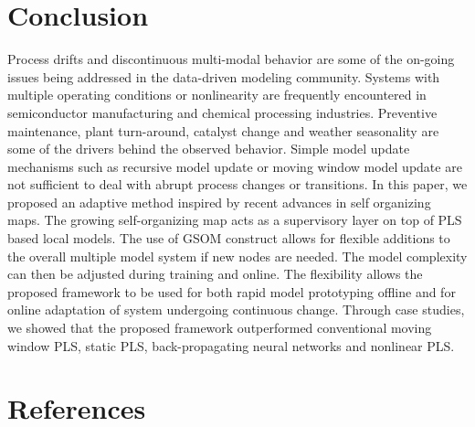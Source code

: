 \documentclass[review,3p]{elsarticle}
\renewcommand\[{\begin{equation}}
\renewcommand\]{\end{equation}}
\begin{document}
\section{Conclusion}
Process drifts and discontinuous multi-modal behavior are some of the on-going issues being addressed in the data-driven modeling community. Systems with multiple operating conditions or nonlinearity are frequently encountered in semiconductor manufacturing and chemical processing industries. Preventive maintenance, plant turn-around, catalyst change and weather seasonality are some of the drivers behind the observed behavior. Simple model update mechanisms such as recursive model update or moving window model update are not sufficient to deal with abrupt process changes or transitions. In this paper, we proposed an adaptive method inspired by recent advances in self organizing maps. The growing self-organizing map acts as a supervisory layer on top of PLS based local models. The use of GSOM construct allows for flexible additions to the overall multiple model system if new nodes are needed. The model complexity can then be adjusted during training and online. The flexibility allows the proposed framework to be used for both rapid model prototyping offline and for online adaptation of system undergoing continuous change. Through case studies, we showed that the proposed framework outperformed conventional moving window PLS, static PLS, back-propagating neural networks and nonlinear PLS.

\clearpage
\section{References}





\newpage
\listoffigures
\listoftables
\end{document}
